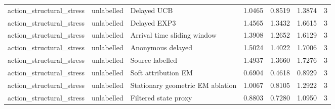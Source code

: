 \begin{tabular}{llllllr}
action\_structural\_stress & unlabelled & Delayed UCB & 1.0465 & 0.8519 & 1.3874 & 3 \\
action\_structural\_stress & unlabelled & Delayed EXP3 & 1.4565 & 1.3432 & 1.6615 & 3 \\
action\_structural\_stress & unlabelled & Arrival time sliding window & 1.3908 & 1.2652 & 1.6129 & 3 \\
action\_structural\_stress & unlabelled & Anonymous delayed & 1.5024 & 1.4022 & 1.7006 & 3 \\
action\_structural\_stress & unlabelled & Source labelled & 1.4937 & 1.3660 & 1.7276 & 3 \\
action\_structural\_stress & unlabelled & Soft attribution EM & 0.6904 & 0.4618 & 0.8929 & 3 \\
action\_structural\_stress & unlabelled & Stationary geometric EM ablation & 1.0067 & 0.8105 & 1.2922 & 3 \\
action\_structural\_stress & unlabelled & Filtered state proxy & 0.8803 & 0.7280 & 1.0950 & 3 \\
\bottomrule
\end{tabular}
